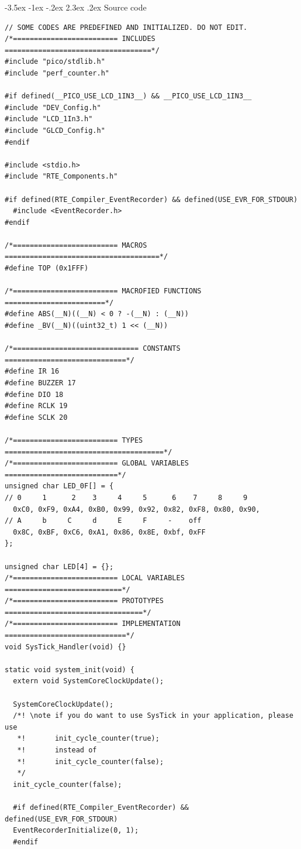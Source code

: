 \documentclass[a4paper,twoside]{report}
\makeatletter
\renewcommand\section{\@startsection {section}{1}{-1em}%
  {-3.5ex \@plus -1ex \@minus -.2ex}%
  {2.3ex \@plus.2ex}%
  {\normalfont\Large\bfseries}}
\makeatother
\begin{document}
\section{Source code}
\begin{verbatim}
// SOME CODES ARE PREDEFINED AND INITIALIZED. DO NOT EDIT.
/*========================= INCLUDES ===================================*/
#include "pico/stdlib.h"
#include "perf_counter.h"

#if defined(__PICO_USE_LCD_1IN3__) && __PICO_USE_LCD_1IN3__
#include "DEV_Config.h"
#include "LCD_1In3.h"
#include "GLCD_Config.h"
#endif

#include <stdio.h>
#include "RTE_Components.h"

#if defined(RTE_Compiler_EventRecorder) && defined(USE_EVR_FOR_STDOUR)
  #include <EventRecorder.h>
#endif

/*========================= MACROS =====================================*/
#define TOP	(0x1FFF)

/*========================= MACROFIED FUNCTIONS ========================*/
#define ABS(__N)((__N) < 0 ? -(__N) : (__N))
#define _BV(__N)((uint32_t) 1 << (__N))

/*============================== CONSTANTS =============================*/
#define IR 16
#define BUZZER 17
#define DIO 18
#define RCLK 19
#define SCLK 20

/*========================= TYPES ======================================*/
/*========================= GLOBAL VARIABLES ===========================*/
unsigned char LED_0F[] = {
// 0     1      2    3     4     5      6    7     8     9
  0xC0, 0xF9, 0xA4, 0xB0, 0x99, 0x92, 0x82, 0xF8, 0x80, 0x90, 
// A     b     C     d     E     F     -    off
  0x8C, 0xBF, 0xC6, 0xA1, 0x86, 0x8E, 0xbf, 0xFF
};

unsigned char LED[4] = {};
/*========================= LOCAL VARIABLES ============================*/
/*========================= PROTOTYPES =================================*/
/*========================= IMPLEMENTATION =============================*/
void SysTick_Handler(void) {}

static void system_init(void) {
  extern void SystemCoreClockUpdate();

  SystemCoreClockUpdate();
  /*! \note if you do want to use SysTick in your application, please use 
   *!       init_cycle_counter(true); 
   *!       instead of 
   *!       init_cycle_counter(false); 
   */
  init_cycle_counter(false);

  #if defined(RTE_Compiler_EventRecorder) && defined(USE_EVR_FOR_STDOUR)
  EventRecorderInitialize(0, 1);
  #endif


\end{verbatim}
\end{document}
